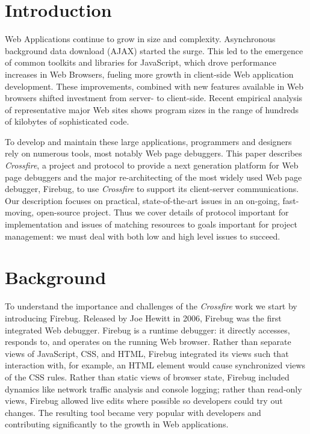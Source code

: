 
\section{Introduction}
Web Applications continue to grow in size and complexity. Asynchronous
background data download (AJAX) started the surge. This led to the emergence of
common toolkits and libraries for JavaScript, which drove  performance increases
in Web Browsers, fueling more growth in client-side Web application development.
These improvements, combined with new features available in Web browsers shifted
investment from server- to client-side. Recent empirical analysis of
representative
 major Web sites shows program sizes in the range of hundreds of kilobytes of
sophisticated code.\cite{VitekDynamicJS2010}

To develop and maintain these large applications, programmers and designers rely
on numerous tools, most notably Web page debuggers. This paper describes \textit{Crossfire},
a project and protocol to provide a next generation platform for Web page debuggers and the major
re-architecting of the most widely used Web page debugger, Firebug, to use \textit{Crossfire}
to support its client-server communications. Our description focuses on
practical, state-of-the-art issues in an on-going, fast-moving, open-source project. Thus
we cover details of protocol important for implementation and issues of matching
resources to goals important for project management: we must deal with both
low and high level issues to succeed.

\section{Background}
To understand the importance and challenges of the \textit{Crossfire} work we
start by introducing Firebug. Released by Joe Hewitt in 2006, Firebug was the
first integrated Web debugger. Firebug is a runtime debugger: it directly
accesses, responds to, and operates on the running Web browser.  Rather than
separate views of JavaScript, CSS, and HTML, Firebug integrated its views such
that interaction with, for example, an HTML element would cause synchronized
views of the CSS rules. Rather than static
 views of browser state, Firebug included dynamics like network traffic analysis
 and console logging; rather
than read-only views, Firebug allowed live edits where possible so developers
could try out changes. The resulting tool became very popular with developers
and contributing significantly to the growth in Web applications.

